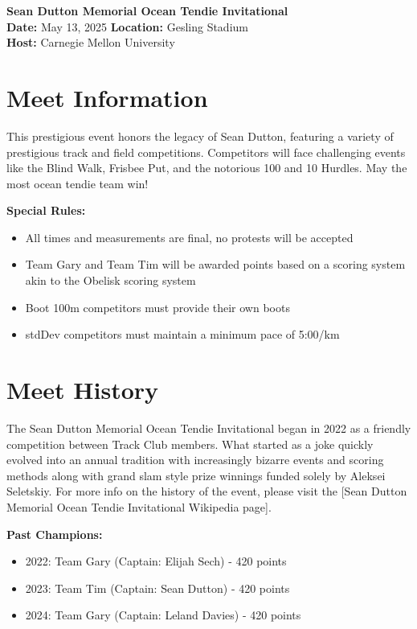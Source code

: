 \documentclass[10pt]{article}
\begin{document}
\begin{center}
    \LARGE \textbf{Sean Dutton Memorial Ocean Tendie Invitational} \\
    \large
    \vspace{0.5em}
    \textbf{Date:} May 13, 2025 \hspace{2cm} \textbf{Location:} Gesling Stadium \\
    \textbf{Host:} Carnegie Mellon University
\end{center}

\vspace{1em}

\section*{Meet Information}
This prestigious event honors the legacy of Sean Dutton, featuring a variety of prestigious track and field competitions. Competitors will face challenging events like the Blind Walk, Frisbee Put, and the notorious 100 and 10 Hurdles. May the most ocean tendie team win!
            
\textbf{Special Rules:}
\begin{itemize}
  \item All times and measurements are final, no protests will be accepted
  \item Team Gary and Team Tim will be awarded points based on a scoring system akin to the Obelisk scoring system
  \item Boot 100m competitors must provide their own boots
  \item stdDev competitors must maintain a minimum pace of 5:00/km
\end{itemize}


\vspace{1em}

\section*{Meet History}
The Sean Dutton Memorial Ocean Tendie Invitational began in 2022 as a friendly competition between Track Club members. What started as a joke quickly evolved into an annual tradition with increasingly bizarre events and scoring methods along with grand slam style prize winnings funded solely by Aleksei Seletskiy. For more info on the history of the event, please visit the [Sean Dutton Memorial Ocean Tendie Invitational Wikipedia page].

\vspace{0.5em}
\textbf{Past Champions:}
\begin{itemize}
  \item 2022: Team Gary (Captain: Elijah Sech) - 420 points
  \item 2023: Team Tim (Captain: Sean Dutton) - 420 points
  \item 2024: Team Gary (Captain: Leland Davies) - 420 points
\end{itemize}
\end{document}
